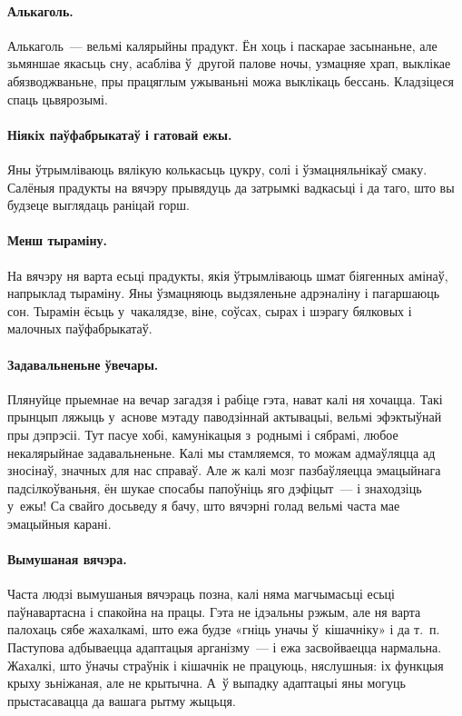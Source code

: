 
\paragraph{Алькаголь.}
Алькаголь~--- вельмі калярыйны прадукт. Ён хоць і паскарае засынаньне, але зьмяншае якасьць сну, асабліва ў~другой палове ночы, узмацняе храп, выклікае абязводжваньне, пры працяглым ужываньні можа выклікаць бессань. Кладзіцеся спаць цьвярозымі.

\paragraph{Ніякіх паўфабрыкатаў і гатовай ежы.}
Яны ўтрымліваюць вялікую колькасьць цукру, солі і ўзмацняльнікаў смаку. Салёныя прадукты на вячэру прывядуць да затрымкі вадкасьці і да таго, што вы будзеце выглядаць раніцай горш.

\paragraph{Менш тыраміну.}
На вячэру ня варта есьці прадукты, якія ўтрымліваюць шмат біягенных амінаў, напрыклад тыраміну. Яны ўзмацняюць выдзяленьне адрэналіну і пагаршаюць сон. Тырамін ёсьць у~чакалядзе, віне, соўсах, сырах і шэрагу бялковых і малочных паўфабрыкатаў.

\paragraph{Задавальненьне ўвечары.}
Плянуйце прыемнае на вечар загадзя і рабіце гэта, нават калі ня хочацца. Такі прынцып ляжыць у~аснове мэтаду паводзіннай актывацыі, вельмі эфэктыўнай пры дэпрэсіі. Тут пасуе хобі, камунікацыя з~роднымі і сябрамі, любое некалярыйнае задавальненьне. Калі мы стамляемся, то можам адмаўляцца ад зносінаў, значных для нас справаў. Але ж калі мозг пазбаўляецца эмацыйнага падсілкоўваньня, ён шукае спосабы папоўніць яго дэфіцыт~--- і знаходзіць у~ежы! Са свайго досьведу я бачу, што вячэрні голад вельмі часта мае эмацыйныя карані.

\paragraph{Вымушаная вячэра.}
Часта людзі вымушаныя вячэраць позна, калі няма магчымасьці есьці паўнавартасна і спакойна на працы. Гэта не ідэальны рэжым, але ня варта палохаць сябе жахалкамі, што ежа будзе «гніць уначы ў~кішачніку» і да т.~п. Паступова адбываецца адаптацыя арганізму~--- і ежа засвойваецца нармальна. Жахалкі, што ўначы страўнік і кішачнік не працуюць, няслушныя: іх функцыя крыху зьніжаная, але не крытычна. А~ў выпадку адаптацыі яны могуць прыстасавацца да вашага рытму жыцьця.